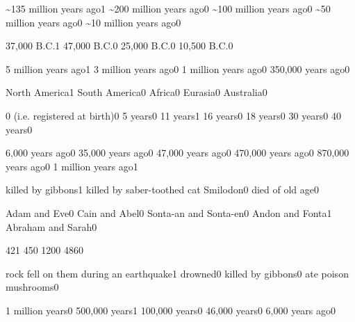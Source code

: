 
{\textasciitilde 135 million years ago}{1}
{\textasciitilde 200 million years ago}{0}
{\textasciitilde 100 million years ago}{0}
{\textasciitilde 50 million years ago}{0}
{\textasciitilde 10 million years ago}{0}
\qstop


{37,000 B.C.}{1}
{47,000 B.C.}{0}
{25,000 B.C.}{0}
{10,500 B.C.}{0}
\qstop

{5 million years ago}{1}
{3 million years ago}{0}
{1 million years ago}{0}
{350,000 years ago}{0}
\qstop

{North America}{1}
{South America}{0}
{Africa}{0}
{Eurasia}{0}
{Australia}{0}
\qstop

{0 (i.e. registered at birth)}{0}
{5 years}{0}
{11 years}{1}
{16 years}{0}
{18 years}{0}
{30 years}{0}
{40 years}{0}
\qstop


{6,000 years ago}{0}
{35,000 years ago}{0}
{47,000 years ago}{0}
{470,000 years ago}{0}
{870,000 years ago}{0}
{1 million years ago}{1}
\qstop

{killed by gibbons}{1}
{killed by saber-toothed cat Smilodon}{0}
{died of old age}{0}
\qstop


{Adam and Eve}{0}
{Cain and Abel}{0}
{Sonta\hyp{}an and Sonta\hyp{}en}{0}
{Andon and Fonta}{1}
{Abraham and Sarah}{0}
\qstop

{42}{1}
{45}{0}
{120}{0}
{486}{0}
\qstop

{rock fell on them during an earthquake}{1}
{drowned}{0}
{killed by gibbons}{0}
{ate poison mushrooms}{0}
\qstop


{1 million years}{0}
{500,000 years}{1}
{100,000 years}{0}
{46,000 years}{0}
{6,000 years ago}{0}
\qstop

